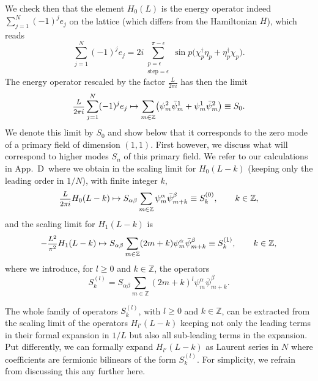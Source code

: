 \documentclass[11pt]{article}
\newcommand{\ffrac}[2]{\mbox{\footnotesize$\displaystyle\frac{#1}{#2}$}}
\newcommand{\sferm}{\psi}
\newcommand{\bsferm}{\bar{\psi}}
\newcommand{\sfermp}{\psi^{2}}
\newcommand{\sfermm}{\psi^{1}}
\newcommand{\bsfermp}{\bar{\psi}^{2}}
\newcommand{\bsfermm}{\bar{\psi}^{1}}
\newcommand{\oZ}{\mathbb{Z}}
\newcommand{\step}{\epsilon}
\newcommand{\energy}{energy }
\newcommand{\enrg}{S}
\newcommand{\AppHln}{D}
\theoremstyle{definition}
\begin{document}
We check  then that the element $H_0(L)$ is the energy operator indeed $\sum_{j=1}^N(-1)^j e_j$ on the lattice (which differs from the Hamiltonian $H$), which reads
\begin{equation}
\sum_{j=1}^N(-1)^j e_j =2i \sum_{\substack{p=\step\\\text{step}=\step}}^{\pi-\step}\sin{p}\bigl(\chi^{\dagger}_p\eta_{p}
+ \eta^{\dagger}_p\chi_{p}\bigr).
\end{equation}
The  \energy operator rescaled by the factor $\frac{L}{2\pi i}$ has then the limit
\begin{equation*}
\ffrac{L}{2\pi i}\sum_{j=1}^N(-1)^j e_j \mapsto \sum_{m\in\oZ} \bigl(\sfermp_{m}\bsfermm_m + \sfermm_{m}\bsfermp_m \bigr)\equiv \enrg_0.
\end{equation*}
We denote this limit by $\enrg_0$ and show below that it corresponds to the zero mode of a primary field of dimension $(1,1)$. First however, we discuss what will correspond to higher modes $\enrg_n$ of this primary field. We refer to our calculations in App.~\AppHln~where we obtain in
the scaling limit for $H_0(L-k)$ (keeping only the leading order in $1/N$), with finite integer
$k$,
\begin{equation}\label{scal-lim-Hn}
\ffrac{L}{2\pi i}H_0(L-k) \mapsto  S_{\alpha \beta}\sum_{m\in\oZ}\sferm^{\alpha}_{m}\bsferm^{\beta}_{m+k}  \equiv
\enrg^{(0)}_k,\qquad k\in\oZ,
\end{equation}
and the scaling limit for $H_1(L-k)$ is
\begin{equation}
-\ffrac{L^2}{\pi^2}H_1(L-k) \mapsto S_{\alpha
 \beta}\sum_{m\in\oZ}(2m+k)\sferm^{\alpha}_{m}\bsferm^{\beta}_{m+k}\equiv
 \enrg^{(1)}_k,\qquad k\in\oZ,
\end{equation}
where we introduce, for $l\geq 0$ and $k\in\oZ$, the operators
\begin{equation}\label{enrgl-def}
\enrg^{(l)}_k=S_{\alpha \beta}\sum_{m\in\oZ}(2m+k)^l\sferm^{\alpha}_{m}\bsferm^{\beta}_{m+k}.
\end{equation}

The whole family of operators $\enrg^{(l)}_k$, with $l\geq0$ and $k\in\oZ$, can be extracted from the scaling limit of
the operators $H_{l'}(L-k)$ keeping not only the leading terms in their formal expansion in $1/L$ but also all sub-leading terms in the
expansion. Put differently, we can formally expand $H_{l'}(L-k)$ as Laurent series in $N$ where coefficients are fermionic bilinears of the form  $\enrg^{(l)}_k$. For simplicity, we refrain from discussing this any further here.
\end{document}
